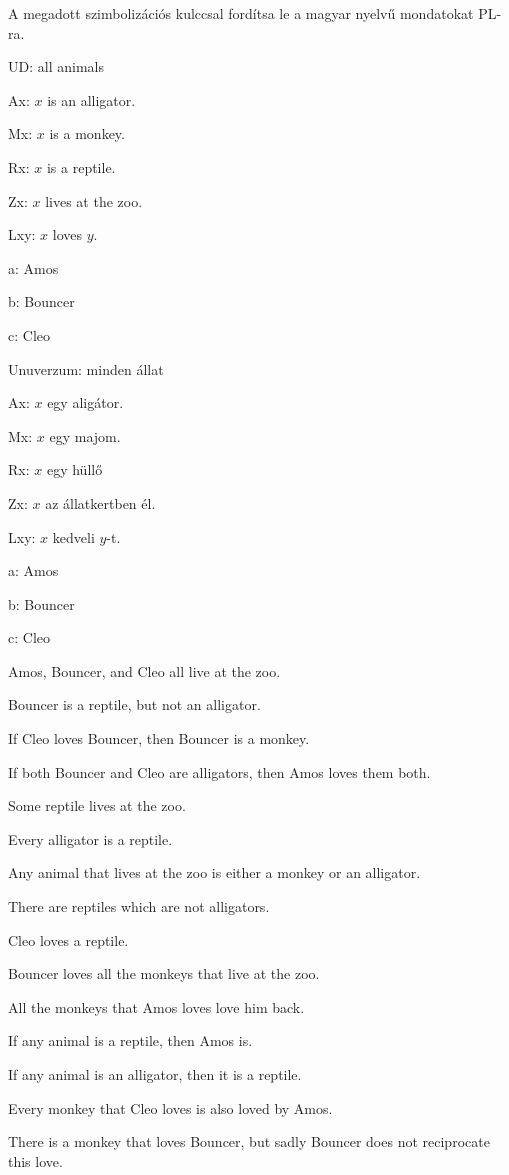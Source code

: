A megadott szimbolizációs kulccsal fordítsa le a magyar nyelvű mondatokat PL-ra.
\begin{ekey}
\item[UD:] all animals
\item[Ax:] $x$ is an alligator.
\item[Mx:] $x$ is a monkey.
\item[Rx:] $x$ is a reptile.
\item[Zx:] $x$ lives at the zoo.
\item[Lxy:] $x$ loves $y$.
\item[a:] Amos
\item[b:] Bouncer
\item[c:] Cleo
\end{ekey}
\begin{ekey}
\item[Unuverzum:] minden állat
\item[Ax:] $x$ egy aligátor.
\item[Mx:] $x$ egy majom.
\item[Rx:] $x$ egy hüllő
\item[Zx:] $x$ az állatkertben él.
\item[Lxy:] $x$ kedveli $y$-t.
\item[a:] Amos
\item[b:] Bouncer
\item[c:] Cleo
\end{ekey}
\begin{earg}
\item Amos, Bouncer, and Cleo all live at the zoo. 
\item Bouncer is a reptile, but not an alligator. 
\item If Cleo loves Bouncer, then Bouncer is a monkey. 
\item If both Bouncer and Cleo are alligators, then Amos loves them both.
\item Some reptile lives at the zoo. 
\item Every alligator is a reptile. 
\item Any animal that lives at the zoo is either a monkey or an alligator. 
\item There are reptiles which are not alligators.
\item Cleo loves a reptile.
\item Bouncer loves all the monkeys that live at the zoo.
\item All the monkeys that Amos loves love him back.
\item If any animal is a reptile, then Amos is.
\item If any animal is an alligator, then it is a reptile.
\item Every monkey that Cleo loves is also loved by Amos.
\item There is a monkey that loves Bouncer, but sadly Bouncer does not reciprocate this love.
\end{earg}
